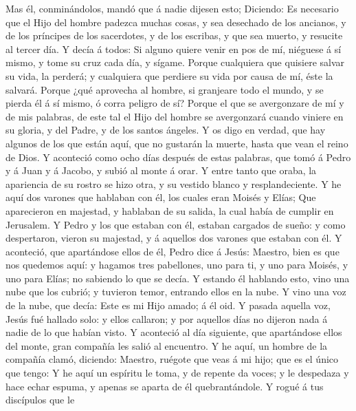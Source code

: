  Mas él, conminándolos, mandó que á nadie dijesen esto;
 Diciendo: Es necesario que el Hijo del hombre padezca
muchas cosas, y sea desechado de los ancianos, y de los príncipes de los
sacerdotes, y de los escribas, y que sea muerto, y resucite al tercer
día.  Y decía á todos: Si alguno quiere venir en pos de mí,
niéguese á sí mismo, y tome su cruz cada día, y sígame. 
Porque cualquiera que quisiere salvar su vida, la perderá; y cualquiera
que perdiere su vida por causa de mí, éste la salvará. 
Porque ¿qué aprovecha al hombre, si granjeare todo el mundo, y se pierda
él á sí mismo, ó corra peligro de sí?  Porque el que se
avergonzare de mí y de mis palabras, de este tal el Hijo del hombre se
avergonzará cuando viniere en su gloria, y del Padre, y de los santos
ángeles.  Y os digo en verdad, que hay algunos de los que
están aquí, que no gustarán la muerte, hasta que vean el reino de Dios.
 Y aconteció como ocho días después de estas palabras, que
tomó á Pedro y á Juan y á Jacobo, y subió al monte á orar. 
Y entre tanto que oraba, la apariencia de su rostro se hizo otra, y su
vestido blanco y resplandeciente.  Y he aquí dos varones
que hablaban con él, los cuales eran Moisés y Elías;  Que
aparecieron en majestad, y hablaban de su salida, la cual había de
cumplir en Jerusalem.  Y Pedro y los que estaban con él,
estaban cargados de sueño: y como despertaron, vieron su majestad, y á
aquellos dos varones que estaban con él.  Y aconteció, que
apartándose ellos de él, Pedro dice á Jesús: Maestro, bien es que nos
quedemos aquí: y hagamos tres pabellones, uno para ti, y uno para
Moisés, y uno para Elías; no sabiendo lo que se decía.  Y
estando él hablando esto, vino una nube que los cubrió; y tuvieron
temor, entrando ellos en la nube.  Y vino una voz de la
nube, que decía: Este es mi Hijo amado; á él oid.  Y pasada
aquella voz, Jesús fué hallado solo: y ellos callaron; y por aquellos
días no dijeron nada á nadie de lo que habían visto.  Y
aconteció al día siguiente, que apartándose ellos del monte, gran
compañía les salió al encuentro.  Y he aquí, un hombre de
la compañía clamó, diciendo: Maestro, ruégote que veas á mi hijo; que es
el único que tengo:  Y he aquí un espíritu le toma, y de
repente da voces; y le despedaza y hace echar espuma, y apenas se aparta
de él quebrantándole.  Y rogué á tus discípulos que le
